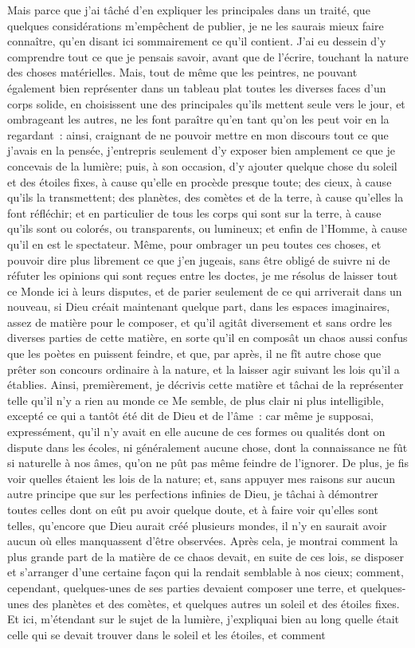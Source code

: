 \documentclass[french,twoside]{book} %
\begin{document}
Mais parce que j'ai tâché d'en expliquer les principales dans un traité, que quelques considérations m'empêchent de publier, je ne les saurais mieux faire connaître, qu'en disant ici sommairement ce qu'il contient. J'ai eu dessein d'y comprendre tout ce que je pensais savoir, avant que de l'écrire, touchant la nature des choses matérielles. Mais, tout de même que les peintres, ne pouvant également bien représenter dans un tableau plat toutes les diverses faces d'un corps solide, en choisissent une des principales qu'ils mettent seule vers le jour, et ombrageant les autres, ne les font paraître qu'en tant qu'on les peut voir en la regardant : ainsi, craignant de ne pouvoir mettre en mon discours tout ce que j'avais en la pensée, j'entrepris seulement d'y exposer bien amplement ce que je concevais de la lumière; puis, à son occasion, d'y ajouter quelque chose du soleil et des étoiles fixes, à cause qu'elle en procède presque toute; des cieux, à cause qu'ils la transmettent; des planètes, des comètes et de la terre, à cause qu'elles la font réfléchir; et en particulier de tous les corps qui sont sur la terre, à cause qu'ils sont ou colorés, ou transparents, ou lumineux; et enfin de l'Homme, à cause qu'il en est le spectateur. Même, pour ombrager un peu toutes ces choses, et pouvoir dire plus librement ce que j'en jugeais, sans être obligé de suivre ni de réfuter les opinions qui sont reçues entre les doctes, je me résolus de laisser tout ce Monde ici à leurs disputes, et de parier seulement de ce qui arriverait dans un nouveau, si Dieu créait maintenant quelque part, dans les espaces imaginaires, assez de matière pour le composer, et qu'il agitât diversement et sans ordre les diverses parties de cette matière, en sorte qu'il en composât un chaos aussi confus que les poètes en puissent feindre, et que, par après, il ne fît autre chose que prêter son concours ordinaire à la nature, et la laisser agir suivant les lois qu'il a établies. Ainsi, premièrement, je décrivis cette matière et tâchai de la représenter telle qu'il n'y a rien au monde ce Me semble, de plus clair ni plus intelligible, excepté ce qui a tantôt été dit de Dieu et de l'âme : car même je supposai, expressément, qu'il n'y avait en elle aucune de ces formes ou qualités dont on dispute dans les écoles, ni généralement aucune chose, dont la connaissance ne fût si naturelle à nos âmes, qu'on ne pût pas même feindre de l'ignorer. De plus, je fis voir quelles étaient les lois de la nature; et, sans appuyer mes raisons sur aucun autre principe que sur les perfections infinies de Dieu, je tâchai à démontrer toutes celles dont on eût pu avoir quelque doute, et à faire voir qu'elles sont telles, qu'encore que Dieu aurait créé plusieurs mondes, il n'y en saurait avoir aucun où elles manquassent d'être observées. Après cela, je montrai comment la plus grande part de la matière de ce chaos devait, en suite de ces lois, se disposer et s'arranger d'une certaine façon qui la rendait semblable à nos cieux; comment, cependant, quelques-unes de ses parties devaient composer une terre, et quelques-unes des planètes et des comètes, et quelques autres un soleil et des étoiles fixes. Et ici, m'étendant sur le sujet de la lumière, j'expliquai bien au long quelle était celle qui se devait trouver dans le soleil et les étoiles, et comment 
\end{document}
